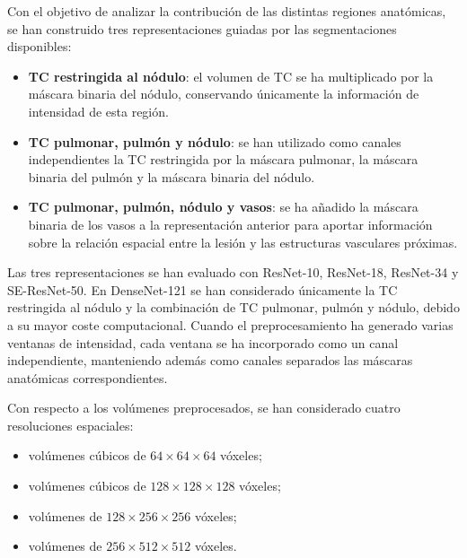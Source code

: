 Con el objetivo de analizar la contribución de las distintas regiones anatómicas, se han construido tres representaciones guiadas por las segmentaciones disponibles:

\begin{itemize}
    \item \textbf{TC restringida al nódulo}: el volumen de TC se ha multiplicado por la máscara binaria del nódulo, conservando únicamente la información de intensidad de esta región.
    \item \textbf{TC pulmonar, pulmón y nódulo}: se han utilizado como canales independientes la TC restringida por la máscara pulmonar, la máscara binaria del pulmón y la máscara binaria del nódulo.
    \item \textbf{TC pulmonar, pulmón, nódulo y vasos}: se ha añadido la máscara binaria de los vasos a la representación anterior para aportar información sobre la relación espacial entre la lesión y las estructuras vasculares próximas.
\end{itemize}

Las tres representaciones se han evaluado con ResNet-10, ResNet-18, ResNet-34 y SE-ResNet-50. En DenseNet-121 se han considerado únicamente la TC restringida al nódulo y la combinación de TC pulmonar, pulmón y nódulo, debido a su mayor coste computacional. Cuando el preprocesamiento ha generado varias ventanas de intensidad, cada ventana se ha incorporado como un canal independiente, manteniendo además como canales separados las máscaras anatómicas correspondientes.


Con respecto a los volúmenes preprocesados, se han considerado cuatro resoluciones espaciales:

\begin{itemize}
    \item volúmenes cúbicos de $64 \times 64 \times 64$ vóxeles;
    \item volúmenes cúbicos de $128 \times 128 \times 128$ vóxeles;
    \item volúmenes de $128 \times 256 \times 256$ vóxeles;
    \item volúmenes de $256 \times 512 \times 512$ vóxeles.
\end{itemize}

